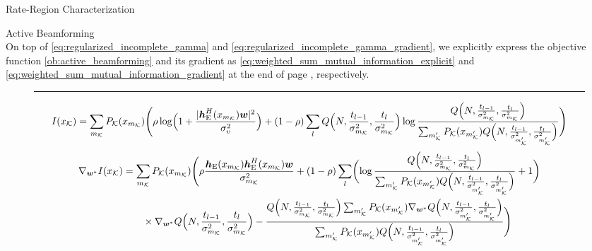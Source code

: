 \documentclass[journal]{IEEEtran}
\begin{document}
\begin{section}{Rate-Region Characterization}
\begin{subsection}{Active Beamforming}
\begin{equation}
			\label{eq:regularized_incomplete_gamma_gradient_component}
		\end{equation}
		On top of \eqref{eq:regularized_incomplete_gamma} and \eqref{eq:regularized_incomplete_gamma_gradient}, we explicitly express the objective function \eqref{ob:active_beamforming} and its gradient as \eqref{eq:weighted_sum_mutual_information_explicit} and \eqref{eq:weighted_sum_mutual_information_gradient} at the end of page \pageref{eq:weighted_sum_mutual_information_explicit}, respectively.
		\begin{figure*}[!b]
			\hrule
			\begin{equation}
				I(x_{\mathcal{K}})=\sum_{m_{\mathcal{K}}}P_{\mathcal{K}}(x_{m_{\mathcal{K}}})\Biggl(\rho\log\Bigl(1+\frac{\lvert\boldsymbol{h}_{\mathrm{E}}^H(x_{m_{\mathcal{K}}})\boldsymbol{w}\rvert^2}{\sigma_v^2}\Bigr)+(1-\rho)\sum_l Q\Bigl(N,\frac{t_{l-1}}{\sigma_{m_{\mathcal{K}}}^2},\frac{t_l}{\sigma_{m_{\mathcal{K}}}^2}\Bigr) \log \frac{Q\Bigl(N,\frac{t_{l-1}}{\sigma_{m_{\mathcal{K}}}^2},\frac{t_l}{\sigma_{m_{\mathcal{K}}}^2}\Bigr)}{\sum_{m_{\mathcal{K}}'} P_{\mathcal{K}}(x_{m_{\mathcal{K}}'}) Q\Bigl(N,\frac{t_{l-1}}{\sigma_{m_{\mathcal{K}}'}^2},\frac{t_l}{\sigma_{m_{\mathcal{K}}'}^2}\Bigr)}\Biggr)
				\label{eq:weighted_sum_mutual_information_explicit}
			\end{equation}
			\begin{align}
				\nabla_{\boldsymbol{w}^*} I(x_{\mathcal{K}})
				 & = \sum_{m_{\mathcal{K}}}P_{\mathcal{K}}(x_{m_{\mathcal{K}}})\Biggl(\rho\frac{\boldsymbol{h}_{\mathrm{E}}(x_{m_{\mathcal{K}}})\boldsymbol{h}_{\mathrm{E}}^H(x_{m_{\mathcal{K}}})\boldsymbol{w}}{\sigma_{m_{\mathcal{K}}}^2}+(1-\rho)\sum_l\biggl(\log\frac{Q\Bigl(N,\frac{t_{l-1}}{\sigma_{m_{\mathcal{K}}}^2},\frac{t_l}{\sigma_{m_{\mathcal{K}}}^2}\Bigr)}{\sum_{m_{\mathcal{K}}'}P_{\mathcal{K}}(x_{m_{\mathcal{K}}'})Q\Bigl(N,\frac{t_{l-1}}{\sigma_{m_{\mathcal{K}}'}^2},\frac{t_l}{\sigma_{m_{\mathcal{K}}'}^2}\Bigr)}+1\biggr)\nonumber                                                                  \\
				 & \qquad \times \nabla_{\boldsymbol{w}^*} Q\Bigl(N,\frac{t_{l-1}}{\sigma_{m_{\mathcal{K}}}^2},\frac{t_l}{\sigma_{m_{\mathcal{K}}}^2}\Bigr)-\frac{Q\Bigl(N,\frac{t_{l-1}}{\sigma_{m_{\mathcal{K}}}^2},\frac{t_l}{\sigma_{m_{\mathcal{K}}}^2}\Bigr)\sum_{m_{\mathcal{K}}'}P_{\mathcal{K}}(x_{m_{\mathcal{K}}'})\nabla_{\boldsymbol{w}^*}Q\Bigl(N,\frac{t_{l-1}}{\sigma_{m_{\mathcal{K}}'}^2},\frac{t_l}{\sigma_{m_{\mathcal{K}}'}^2}\Bigr)}{\sum_{m_{\mathcal{K}}'}P_{\mathcal{K}}(x_{m_{\mathcal{K}}'})Q\Bigl(N,\frac{t_{l-1}}{\sigma_{m_{\mathcal{K}}'}^2},\frac{t_l}{\sigma_{m_{\mathcal{K}}'}^2}\Bigr)}\Biggr)

\end{align}
\end{figure*}
\end{subsection}
\end{section}
\end{document}
